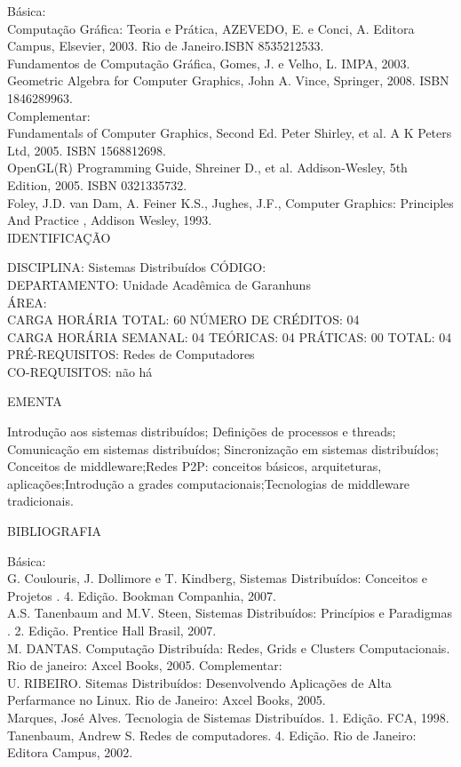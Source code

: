 \documentclass[
	12pt,				%
	openright,			%
  oneside,     %
	a4paper,			%
	english,			%
	french,				%
	spanish,			%
	brazil				%
	]{abntex2}
\begin{document}
\begin{apendicesenv}
Básica:\\
Computação Gráfica: Teoria e Prática, AZEVEDO, E. e Conci, A. Editora
Campus, Elsevier, 2003. Rio de Janeiro.ISBN 8535212533.\\
Fundamentos de Computação Gráfica, Gomes, J. e Velho, L. IMPA, 2003.\\
Geometric Algebra for Computer Graphics, John A. Vince, Springer, 2008.
ISBN 1846289963.\\
Complementar:\\
Fundamentals of Computer Graphics, Second Ed. Peter Shirley, et al. A K
Peters Ltd, 2005. ISBN 1568812698.\\
OpenGL(R) Programming Guide, Shreiner D., et al. Addison-Wesley, 5th
Edition, 2005. ISBN 0321335732.\\
Foley, J.D. van Dam, A. Feiner K.S., Jughes, J.F.,
 Computer Graphics: Principles And
Practice , Addison Wesley, 1993.\\


\newpage IDENTIFICAÇÃO

DISCIPLINA: Sistemas Distribuídos CÓDIGO:\\ 
DEPARTAMENTO: Unidade Acadêmica de Garanhuns\\
ÁREA: \\
CARGA HORÁRIA TOTAL: 60 NÚMERO DE CRÉDITOS: 04\\
CARGA HORÁRIA SEMANAL: 04 TEÓRICAS: 04 PRÁTICAS: 00 TOTAL: 04\\
PRÉ-REQUISITOS: Redes de Computadores\\
CO-REQUISITOS: não há

EMENTA 

Introdução aos sistemas distribuídos; Definições de processos e threads;
Comunicação em sistemas distribuídos; Sincronização em sistemas
distribuídos; Conceitos de middleware;Redes P2P: conceitos básicos,
arquiteturas, aplicações;Introdução a grades computacionais;Tecnologias
de middleware tradicionais.

BIBLIOGRAFIA 

Básica:\\
G. Coulouris, J. Dollimore e T. Kindberg,  Sistemas
Distribuídos: Conceitos e Projetos . 4. Edição.
Bookman Companhia, 2007.\\
A.S. Tanenbaum and M.V. Steen,  Sistemas Distribuídos:
Princípios e Paradigmas . 2. Edição. Prentice Hall
Brasil, 2007.\\
M. DANTAS. Computação Distribuída: Redes, Grids e Clusters
Computacionais. Rio de janeiro: Axcel Books, 2005.
Complementar:\\
U. RIBEIRO. Sitemas Distribuídos: Desenvolvendo Aplicações de Alta
Perfarmance no Linux. Rio de Janeiro: Axcel Books, 2005.\\
Marques, José Alves. Tecnologia de Sistemas Distribuídos. 1. Edição.
FCA, 1998.\\
Tanenbaum, Andrew S. Redes de computadores. 4. Edição. Rio de Janeiro:
Editora Campus, 2002.
\newpage 


\end{apendicesenv}
\end{document}

